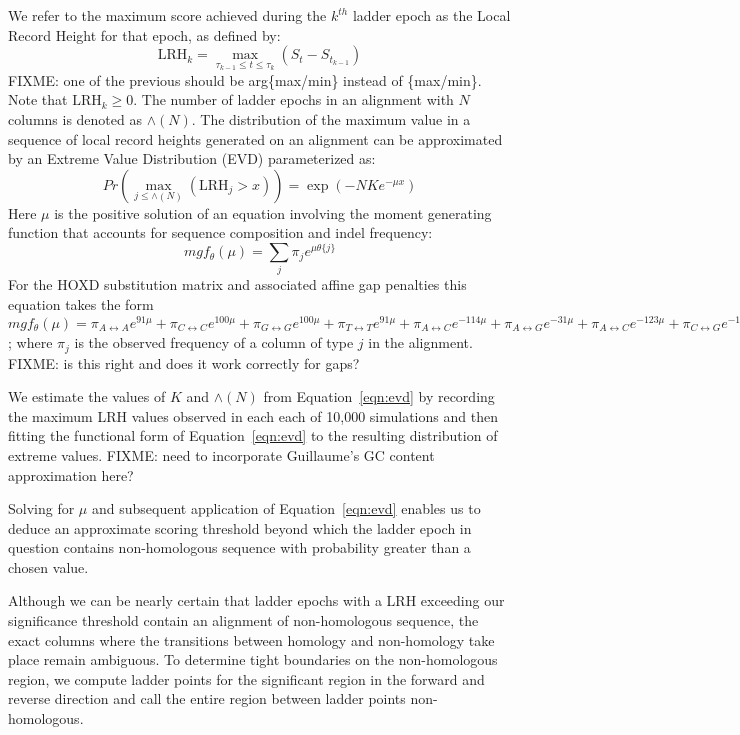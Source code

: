 \documentclass{llncs}
\begin{document}
We refer to the maximum score achieved during the $k^{th}$ ladder epoch as the Local Record Height for that epoch, as defined by:
\begin{equation}
\mathrm{LRH}_k = \max_{\tau_{k-1}\leq t \leq \tau_k}(S_t - S_{t_{k-1}})
\end{equation}
FIXME: one of the previous should be arg\{max/min\} instead of \{max/min\}.  Note that $\mathrm{LRH}_k \geq 0$.  The number of ladder epochs in an alignment with $N$ columns is denoted as $\wedge(N)$.  The distribution of the maximum value in a sequence of local record heights generated on an alignment can be approximated by an Extreme Value Distribution (EVD) parameterized as:
\begin{equation}
\label{eqn:evd}
Pr(\max_{j \leq \wedge(N)}(\mathrm{LRH}_j > x)) = \exp(-NKe^{-\mu x})
\end{equation}
Here $\mu$ is the positive solution of an equation involving the moment generating function that accounts for sequence composition and indel frequency:
\begin{equation}
mgf_\theta(\mu) = \sum_j \pi_j e^{\mu \theta\{j\}}
\end{equation}
For the HOXD substitution matrix and associated affine gap penalties this equation takes the form $mgf_\theta(\mu) = \pi_{A\leftrightarrow A}e^{91\mu} + \pi_{C\leftrightarrow C}e^{100\mu} + \pi_{G\leftrightarrow G}e^{100\mu} + \pi_{T\leftrightarrow T}e^{91\mu} + \pi_{A\leftrightarrow C}e^{-114\mu} + \pi_{A\leftrightarrow G}e^{-31\mu} + \pi_{A\leftrightarrow C}e^{-123\mu} + \pi_{C\leftrightarrow G}e^{-125\mu} + \pi_{C\leftrightarrow T}e^{-31\mu} +  \pi_{G\leftrightarrow T}e^{-114\mu} + \pi_{gapopen}e^{-400\mu} + \pi_{gapext}e^{-35\mu}$; where $\pi_j$ is the observed frequency of a column of type $j$ in the alignment.  FIXME: is this right and does it work correctly for gaps?

We estimate the values of $K$ and $\wedge(N)$ from Equation~\ref{eqn:evd} by recording the maximum LRH values observed in each each of 10,000 simulations and then fitting the functional form of Equation~\ref{eqn:evd} to the resulting distribution of extreme values.  FIXME: need to incorporate Guillaume's GC content approximation here?

Solving for $\mu$ and subsequent application of Equation~\ref{eqn:evd} enables us to deduce an approximate scoring threshold beyond which the ladder epoch in question contains non-homologous sequence with probability greater than a chosen value. 

Although we can be nearly certain that ladder epochs with a LRH exceeding our significance threshold contain an alignment of non-homologous sequence, the exact columns where the transitions between homology and non-homology take place remain ambiguous.  To determine tight boundaries on the non-homologous region, we compute ladder points for the significant region in the forward and reverse direction and call the entire region between ladder points non-homologous.
\end{document}
